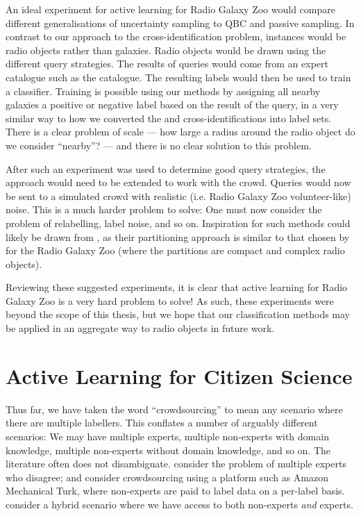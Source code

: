     An ideal experiment for active learning for Radio Galaxy Zoo would compare
    different generalisations of uncertainty sampling to QBC and passive
    sampling. In contrast to our approach to the cross-identification problem,
    instances would be radio objects rather than galaxies. Radio objects would
    be drawn using the different query strategies. The results of queries would
    come from an expert catalogue such as the \citeauthor{norris06} catalogue.
    The resulting labels would then be used to train a classifier. Training is
    possible using our methods by assigning all nearby galaxies a positive or
    negative label based on the result of the query, in a very similar way to
    how we converted the \citeauthor{norris06} and \citeauthor{fan15}
    cross-identifications into label sets. There is a clear problem of scale ---
    how large a radius around the radio object do we consider ``nearby''? ---
    and there is no clear solution to this problem.

    After such an experiment was used to determine good query strategies, the
    approach would need to be extended to work with the crowd. Queries would now
    be sent to a simulated crowd with realistic (i.e. Radio Galaxy Zoo
    volunteer-like) noise. This is a much harder problem to solve: One must now
    consider the problem of relabelling, label noise, and so on. Inspiration for
    such methods could likely be drawn from \citet{mozafari12}, as their
    partitioning approach is similar to that chosen by \citet{banfield15} for
    the Radio Galaxy Zoo (where the partitions are compact and complex radio
    objects).

    Reviewing these suggested experiments, it is clear that active learning for
    Radio Galaxy Zoo is a very hard problem to solve! As such, these experiments
    were beyond the scope of this thesis, but we hope that our classification
    methods may be applied in an aggregate way to radio objects in future work.

\section{Active Learning for Citizen Science}
\label{sec:al-citizen-science}
    
    Thus far, we have taken the word ``crowdsourcing'' to mean any scenario
    where there are multiple labellers. This conflates a number of arguably
    different scenarios: We may have multiple experts, multiple non-experts with
    domain knowledge, multiple non-experts without domain knowledge, and so on.
    The literature often does not disambiguate. \citet{raykar10} consider the
    problem of multiple experts who disagree; \citet{yan10} and
    \citet{mozafari12} consider crowdsourcing using a platform such as Amazon
    Mechanical Turk, where non-experts are paid to label data on a per-label
    basis. \citet{nguyen15} consider a hybrid scenario where we have access to
    both non-experts \emph{and} experts.

